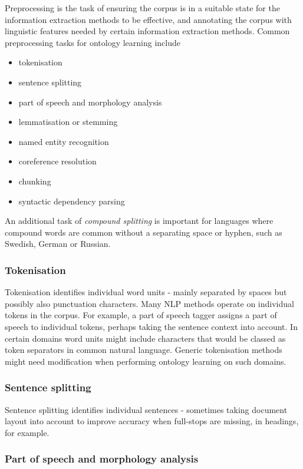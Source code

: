 \documentclass[a4paper]{report}
\begin{document}
Preprocessing is the task of ensuring the corpus is in a suitable state for the information extraction methods to be effective, and annotating the corpus with linguistic features needed by certain information extraction methods.
Common preprocessing tasks for ontology learning include
\begin{itemize}
  \item tokenisation
  \item sentence splitting
  \item part of speech and morphology analysis
  \item lemmatisation or stemming
  \item named entity recognition
  \item coreference resolution
  \item chunking
  \item syntactic dependency parsing
\end{itemize}
An additional task of \emph{compound splitting} is important for languages where compound words are common without a separating space or hyphen, such as Swedish, German or Russian.

\subsubsection{Tokenisation}

Tokenisation identifies individual word units - mainly separated by spaces but possibly also punctuation characters.
Many NLP methods operate on individual tokens in the corpus.
For example, a part of speech tagger assigns a part of speech to individual tokens, perhaps taking the sentence context into account.
In certain domains word units might include characters that would be classed as token separators in common natural language.
Generic tokenisation methods might need modification when performing ontology learning on such domains.

\subsubsection{Sentence splitting}

Sentence splitting identifies individual sentences - sometimes taking document layout into account to improve accuracy when full-stops are missing, in headings, for example.

\subsubsection{Part of speech and morphology analysis}
\end{document}
